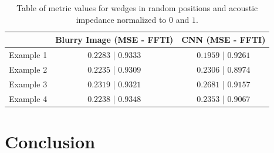 \documentclass[conference]{IEEEtran}
\begin{document}
\begin{table}[!t]
\renewcommand{\arraystretch}{1.2}
\caption{Table of metric values for wedges in random positions and acoustic impedance normalized to $0$ and $1$.}
\label{table_caso_6}
\centering
\begin{tabular}{|c||c||c|}
\hline
  & Blurry Image (MSE - FFTI) & CNN (MSE - FFTI)\\
\hline
Example 1 & $0.2283$ | $0.9333$ & $0.1959$ | $0.9261$\\
\hline
Example 2 & $0.2235$ | $0.9309$ & $0.2306$ | $0.8974$\\
\hline
Example 3 & $0.2319$ | $0.9321$ & $0.2681$ | $0.9157$\\
\hline
Example 4 & $0.2238$ | $0.9348$ & $0.2353$ | $0.9067$\\
\hline
\end{tabular}
\end{table}


\section{Conclusion}
\end{document}
